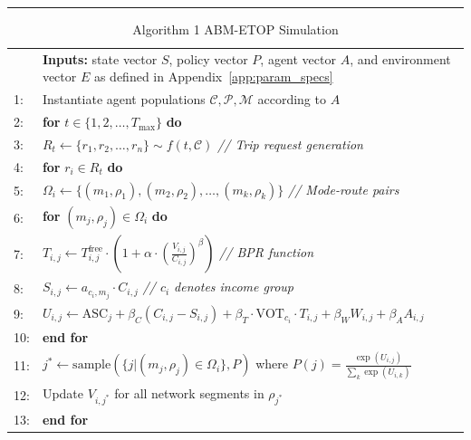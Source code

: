 \documentclass[a4paper,fleqn]{cas-sc}
\begin{document}
\begin{table}[width=\textwidth]
\caption{Algorithm 1 ABM-ETOP Simulation}
\label{alg:abm-etop}
\hrule height 1pt
\vspace{0.5em}
\small
\begin{tabularx}{\textwidth}{p{}Y}
& \textbf{Inputs:} state vector $S$, policy vector $P$, agent vector $A$, and environment vector $E$ as defined in Appendix~\ref{app:param_specs} \\
1: & Instantiate agent populations $\mathcal{C}, \mathcal{P}, \mathcal{M}$ according to $A$ \\
2: & \textbf{for} $t \in \{1,2,\ldots,T_{\text{max}}\}$ \textbf{do} \\
3: & \hspace{1em} $R_t \gets \{r_1, r_2, \ldots, r_n\} \sim f(t, \mathcal{C})$ \textit{// Trip request generation} \\
4: & \hspace{1em} \textbf{for} $r_i \in R_t$ \textbf{do} \\
5: & \hspace{2em} $\Omega_i \gets \{(m_1, \rho_1), (m_2, \rho_2), \ldots, (m_k, \rho_k)\}$ \textit{// Mode-route pairs} \\
6: & \hspace{2em} \textbf{for} $(m_j, \rho_j) \in \Omega_i$ \textbf{do} \\
7: & \hspace{3em} $T_{i,j} \gets T_{i,j}^{\text{free}} \cdot (1 + \alpha \cdot (\frac{V_{i,j}}{C_{i,j}})^{\beta})$ \textit{// BPR function} \\
8: & \hspace{3em} $S_{i,j} \gets a_{c_i,m_j} \cdot C_{i,j}$ \textit{// $c_i$ denotes income group} \\
9: & \hspace{3em} $U_{i,j} \gets \text{ASC}_j + \beta_C(C_{i,j}-S_{i,j}) + \beta_T \cdot \text{VOT}_{c_i} \cdot T_{i,j} + \beta_W W_{i,j} + \beta_A A_{i,j}$ \\
10: & \hspace{2em} \textbf{end for} \\
11: & \hspace{2em} $j^* \gets \text{sample}(\{j | (m_j, \rho_j) \in \Omega_i\}, P)$ where $P(j) = \frac{\exp(U_{i,j})}{\sum_{k} \exp(U_{i,k})}$ \\
12: & \hspace{2em} Update $V_{i,j^*}$ for all network segments in $\rho_{j^*}$ \\
13: & \hspace{1em} \textbf{end for} \\

\end{tabularx}
\end{table}
\end{document}
